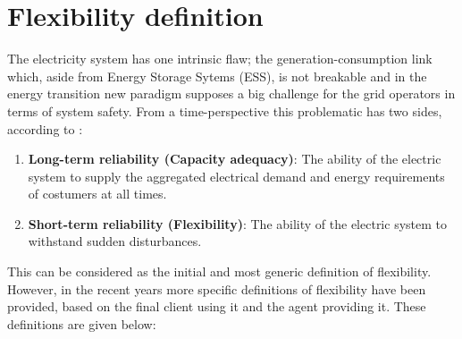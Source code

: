 \section{Flexibility definition}
The electricity system has one intrinsic flaw; the generation-consumption link which, aside from Energy Storage Sytems (ESS), is not breakable and in the energy transition new paradigm supposes a big challenge for the grid operators in terms of system safety. From a time-perspective this problematic has two sides, according to \cite{FINON2008143}:

\begin{enumerate}
\item \textbf{Long-term reliability (Capacity adequacy)}: The ability of the electric system to supply the aggregated electrical demand and energy requirements of costumers at all times.  \cite{FINON2008143}
\item \textbf{Short-term reliability (Flexibility)}: The ability of the electric system to withstand sudden disturbances.
\end{enumerate}

This can be considered as the initial and most generic definition of flexibility. However, in the recent years more specific definitions of flexibility have been provided, based on the final client using it and the agent providing it. These definitions are given below:

